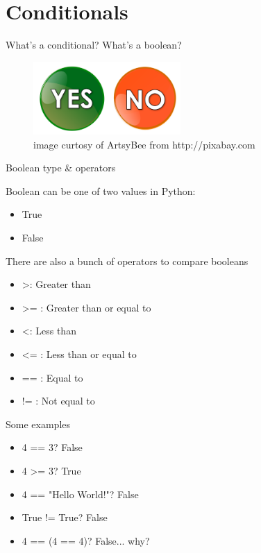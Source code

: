 \documentclass{beamer}
\begin{document}
\section{Conditionals}

\begin{frame}{What's a conditional? What's a boolean?}

\pause

\begin{figure}[h]
\includegraphics[width=0.5\textwidth]{yes}
\caption{image curtosy of ArtsyBee from http://pixabay.com}
\end{figure}


\end{frame}

\begin{frame}{Boolean type \& operators}

Boolean can be one of two values in Python:
\pause
\begin{itemize}
  \item True
  \item False
\end{itemize}

\pause

There are also a bunch of operators to compare booleans
\pause
\begin{itemize}
  \item[] \textgreater  : Greater than
  \pause
  \item[] \textgreater =  : Greater than or equal to
  \pause
  \item[] \textless  : Less than
  \pause
  \item[] \textless =  : Less than or equal to
  \pause
  \item[] == : Equal to
  \pause
  \item[] != : Not equal to
\end{itemize}


\end{frame}

\begin{frame}{Some examples}
\pause
\begin{itemize}
  \item[] 4 == 3? \pause \tab False
  \pause
  \item[] 4 \textgreater = 3? \pause \tab True
  \pause
  \item[] 4 == "Hello World!"? \pause \tab False
  \pause
  \item[] True != True? \pause \tab False
  \pause
  \item[] 4 == (4 == 4)? \pause \tab False... why?
\end{itemize}

\end{frame}
\end{document}
